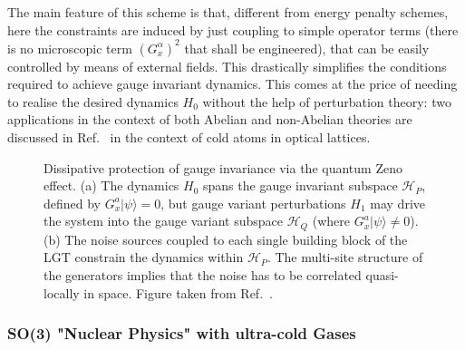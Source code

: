 \documentclass[epj,final]{svjour}
\begin{document}
The main feature of this scheme is that, different from energy penalty schemes, here the constraints are induced by just coupling to simple operator terms (there is no microscopic term $(G^\alpha_x)^2$ that shall be engineered), that can be easily controlled by means of external fields. This drastically simplifies the conditions required to achieve gauge invariant dynamics. This comes at the price of needing to realise the desired dynamics $H_0$ without the help of perturbation theory: two applications in the context of both Abelian and non-Abelian theories are discussed in Ref.~\cite{stannigel2014constrained} in the context of cold atoms in optical lattices.

\begin{figure}[htb]
\begin{center}
\caption{Dissipative protection of gauge invariance via the quantum Zeno effect. (a) The dynamics $H_0$ spans the gauge invariant subspace $\mathcal H_P$, defined by $G_{x}^{a}|\psi\rangle=0$, but gauge variant perturbations $H_1$ may drive the system into the gauge variant subspace $\mathcal H_Q$ (where $G_{x}^{a}|\psi\rangle\neq 0$). (b) The noise sources coupled to each single building block of the LGT constrain the dynamics within $\mathcal H_P$. The multi-site structure of the generators implies that the noise has to be correlated quasi-locally in space. Figure taken from Ref.~\cite{stannigel2014constrained}.
} 
\label{fig:DissLGT}
\end{center}
\end{figure}

\subsubsection{SO(3) "Nuclear Physics" with ultra-cold Gases\cite{rico2018so}}
\end{document}
